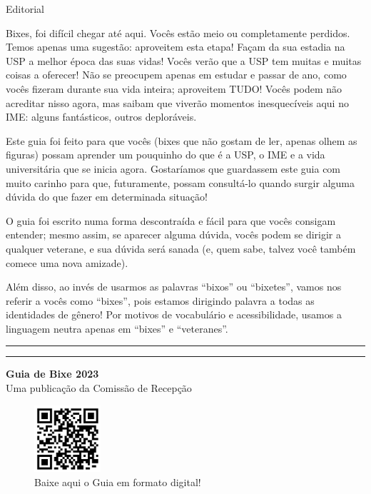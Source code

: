 \begin{editorial}{Editorial}

Bixes, foi difícil chegar até aqui. Vocês
estão meio ou completamente perdidos. Temos apenas uma sugestão: aproveitem esta
etapa! Façam da sua estadia na USP a melhor época das suas vidas! Vocês verão
que a USP tem muitas e muitas coisas a oferecer! Não se preocupem apenas em
estudar e passar de ano, como vocês fizeram durante sua vida inteira; aproveitem
TUDO! Vocês podem não acreditar nisso agora, mas saibam que viverão momentos
inesquecíveis aqui no IME: alguns fantásticos, outros deploráveis.

Este guia foi feito para que vocês (bixes que não gostam de ler, apenas olhem as figuras)
possam aprender um pouquinho do que é a USP,
o IME e a vida universitária que se inicia agora. 
Gostaríamos que guardassem este guia com muito carinho para que, futuramente, possam consultá-lo
quando surgir alguma dúvida do que fazer em determinada situação!

O guia foi escrito numa forma
descontraída e fácil para que vocês consigam entender; mesmo assim, se aparecer
alguma dúvida, vocês podem se dirigir a qualquer veterane, e sua dúvida será
sanada (e, quem sabe, talvez você também comece uma nova amizade).

Além disso, ao invés de usarmos as palavras ``bixos'' ou ``bixetes'', vamos nos referir
a vocês como ``bixes'', pois estamos dirigindo palavra a todas as identidades de 
gênero! Por motivos de vocabulário e acessibilidade, usamos a linguagem neutra 
apenas em ``bixes'' e ``veteranes''.


\rule{\textwidth}{0.5ex}\rule{2ex}{0.5ex}

{\large\bf Guia de Bixe 2023} \\
Uma publicação da Comissão de Recepção


\begin{figure}
  \begin{center}
    \includegraphics[width=0.22\textwidth]{img/qrcode_guia2023.pdf}
  \end{center}
  \vspace{-20pt}
  \caption{Baixe aqui o Guia em formato digital!}
  \vspace{80pt}
\end{figure} 


\end{editorial}
